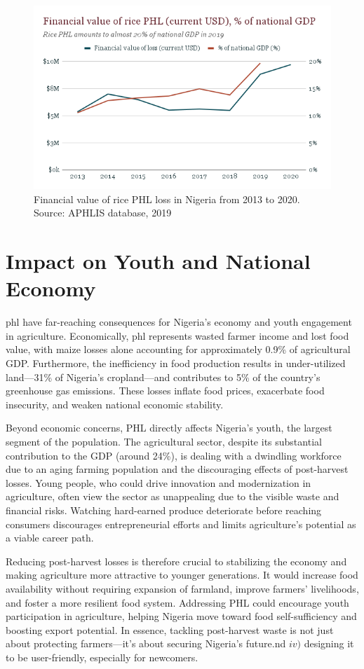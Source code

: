 {\begin{figure}[H]
    \centering
    \includegraphics[scale=0.7]{Figures/phl_rice_financial_value.png}
    \caption{Financial value of rice PHL loss in Nigeria from 2013 to 2020. Source: APHLIS database, 2019}
    \label{fig:figure-04}
\end{figure}



\section{Impact on Youth and National Economy}

\acrshort{phl} have far-reaching consequences for Nigeria’s economy and youth engagement in agriculture. Economically, \acrshort{phl}  represents wasted farmer income and lost food value, with maize losses alone accounting for approximately 0.9\% of agricultural GDP. Furthermore, the inefficiency in food production results in under-utilized land—31\% of Nigeria’s cropland—and contributes to 5\% of the country’s greenhouse gas emissions. These losses inflate food prices, exacerbate food insecurity, and weaken national economic stability.

Beyond economic concerns, PHL directly affects Nigeria’s youth, the largest segment of the population. The agricultural sector, despite its substantial contribution to the GDP (around 24\%), is dealing with a dwindling workforce due to an aging farming population and the discouraging effects of post-harvest losses. Young people, who could drive innovation and modernization in agriculture, often view the sector as unappealing due to the visible waste and financial risks. Watching hard-earned produce deteriorate before reaching consumers discourages entrepreneurial efforts and limits agriculture’s potential as a viable career path.

Reducing post-harvest losses is therefore crucial to stabilizing the economy and making agriculture more attractive to younger generations. It would increase food availability without requiring expansion of farmland, improve farmers’ livelihoods, and foster a more resilient food system. Addressing PHL could encourage youth participation in agriculture, helping Nigeria move toward food self-sufficiency and boosting export potential. In essence, tackling post-harvest waste is not just about protecting farmers—it’s about securing Nigeria’s future.nd \(iv)\) designing it to be user-friendly, especially for newcomers.
}